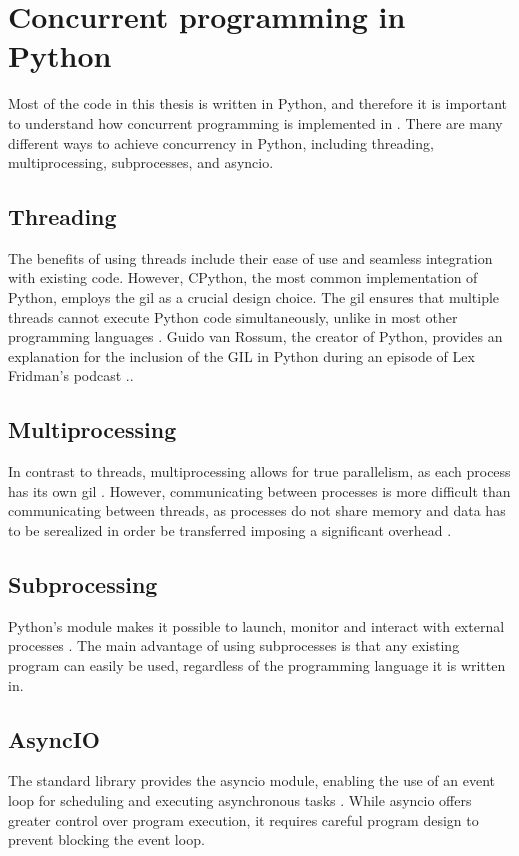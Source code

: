 \section{Concurrent programming in Python}
\label{sec:concurrent_programming_in_python}
Most of the code in this thesis is written in Python, and therefore it is important to understand how concurrent programming is implemented in \py.
There are many different ways to achieve concurrency in Python, including threading, multiprocessing, subprocesses, and \gls{asyncio}.

\subsection{Threading}
The benefits of using threads include their ease of use and seamless integration with existing code. However, CPython, the most common implementation of Python, employs the \gls{gil} as a crucial design choice. The \gls{gil} ensures that multiple threads cannot execute Python code simultaneously, unlike in most other programming languages \cite{ajitsariaWhatPythonGlobal2018}. Guido van Rossum, the creator of Python, provides an explanation for the inclusion of the GIL in Python during an episode of Lex Fridman's podcast \cite{lexfridmanGuidoVanRossum2022}..

\subsection{Multiprocessing}
In contrast to threads, multiprocessing allows for true parallelism, as each process has its own \gls{gil} \cite{ajitsariaWhatPythonGlobal2018}.
However, communicating between processes is more difficult than communicating between threads, as processes do not share memory and data has to be serealized in order be transferred imposing a significant overhead \cite{pythonsoftwarefoundationMultiprocessingProcessbasedParallelism}.

\subsection{Subprocessing}
Python's  module makes it possible to launch, monitor and interact with external processes \cite{pythonsoftwarefoundationSubprocessSubprocessManagement}.
The main advantage of using subprocesses is that any existing program can easily be used, regardless of the programming language it is written in.

\subsection{AsyncIO}
The \py standard library provides the \gls{asyncio} module, enabling the use of an event loop for scheduling and executing asynchronous tasks \cite{pythonsoftwarefoundationAsyncioAsynchronous}.
While \gls{asyncio} offers greater control over program execution, it requires careful program design to prevent blocking the event loop.

